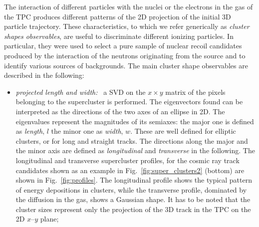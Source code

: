 The interaction of different particles with the nuclei or the
electrons in the gas of the TPC produces different patterns of the 2D
projection of the initial 3D particle trajectory.  These
characteristics, to which we refer generically as \textit{cluster
shapes observables}, are useful to discriminate different ionizing
particles. In particular, they were used to select a pure sample of
nuclear recoil candidates produced by the interaction of the neutrons
originating from the \ambe source and to identify various sources of
backgrounds. The main cluster shape observables are described in the
following:

\begin{itemize}
  \item \textit{projected length and width:~} a SVD on the $x \times
    y$ matrix of the pixels belonging to the supercluster is
    performed. The eigenvectors found can be interpreted as the
    directions of the two axes of an ellipse in 2D. The eigenvalues
    represent the magnitudes of its semiaxes: the major one is defined
    as \textit{length}, $l$ the minor one as \textit{width},
    $w$. These are well defined for elliptic clusters, or for long and
    straight tracks. The directions along the major and the minor axis
    are defined as \textit{longitudinal} and \textit{transverse} in
    the following. The longitudinal and transverse supercluster
    profiles, for the cosmic ray track candidates shown as an example
    in Fig.~\ref{fig:super_clusters2} (bottom) are shown in
    Fig.~\ref{fig:profiles}. The longitudinal profile shows the
    typical pattern of energy depositions in clusters, while the
    transverse profile, dominated by the diffusion in the gas, shows a
    Gaussian shape. It has to be noted that the cluster sizes
    represent only the projection of the 3D track in the TPC on the 2D
    $x$--$y$ plane;


\end{itemize}
